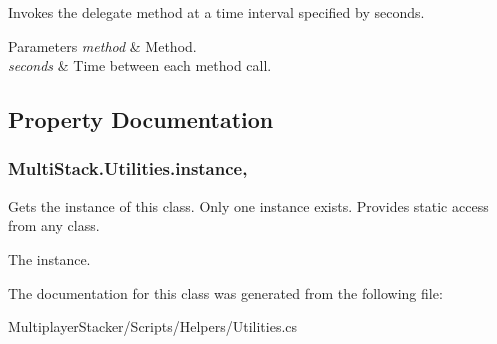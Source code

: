 Invokes the delegate method at a time interval specified by seconds. 


\begin{DoxyParams}{Parameters}
{\em method} & Method.\\
\hline
{\em seconds} & Time between each method call.\\
\hline
\end{DoxyParams}


\subsection{Property Documentation}
\hypertarget{class_multi_stack_1_1_utilities_a5565570f4adb8534d282ce1e0835f2e0}{}
\subsubsection[{instance}]{ Multi\+Stack.\+Utilities.\+instance\hspace{0.3cm}{\ttfamily [static]}, {\ttfamily [get]}}\label{class_multi_stack_1_1_utilities_a5565570f4adb8534d282ce1e0835f2e0}


Gets the instance of this class. Only one instance exists. Provides static access from any class. 

The instance.

The documentation for this class was generated from the following file\+:\begin{DoxyCompactItemize}
\item 
Multiplayer\+Stacker/\+Scripts/\+Helpers/Utilities.\+cs\end{DoxyCompactItemize}
